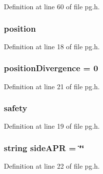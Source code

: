 Definition at line 60 of file pg.\+h.

\subsubsection[{\texorpdfstring{position}{position}}]{ position}\hypertarget{class_k_1_1_p_g_afa6993a0243f938ec8a0b7a0ebc7a4d6}{}\label{class_k_1_1_p_g_afa6993a0243f938ec8a0b7a0ebc7a4d6}


Definition at line 18 of file pg.\+h.

\subsubsection[{\texorpdfstring{position\+Divergence}{positionDivergence}}]{ position\+Divergence = 0}\hypertarget{class_k_1_1_p_g_a158e860ce785d482b11cf81a6544cbd6}{}\label{class_k_1_1_p_g_a158e860ce785d482b11cf81a6544cbd6}


Definition at line 21 of file pg.\+h.

\subsubsection[{\texorpdfstring{safety}{safety}}]{ safety}\hypertarget{class_k_1_1_p_g_a03dcb43533cb6cabba43716d9207b789}{}\label{class_k_1_1_p_g_a03dcb43533cb6cabba43716d9207b789}


Definition at line 19 of file pg.\+h.

\subsubsection[{\texorpdfstring{side\+A\+PR}{sideAPR}}]{\setlength{\rightskip}{0pt plus 5cm}string side\+A\+PR = \char`\"{}\char`\"{}}\hypertarget{class_k_1_1_p_g_af1d15671cf0f5d0d6c5ebac51f08bae1}{}\label{class_k_1_1_p_g_af1d15671cf0f5d0d6c5ebac51f08bae1}


Definition at line 22 of file pg.\+h.

